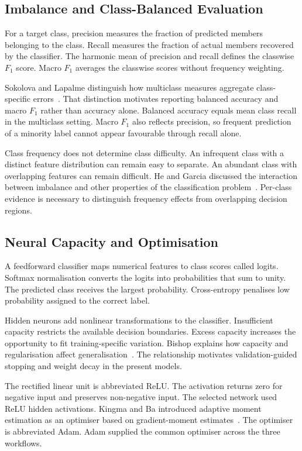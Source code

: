 \documentclass[conference,10pt]{IEEEtran}
\begin{document}
\subsection{Imbalance and Class-Balanced Evaluation}

For a target class, precision measures the fraction of predicted members belonging to the class. Recall measures the fraction of actual members recovered by the classifier. The harmonic mean of precision and recall defines the classwise $F_1$ score. Macro $F_1$ averages the classwise scores without frequency weighting.

Sokolova and Lapalme distinguish how multiclass measures aggregate class-specific errors~\cite{sokolova2009}. That distinction motivates reporting balanced accuracy and macro $F_1$ rather than accuracy alone. Balanced accuracy equals mean class recall in the multiclass setting. Macro $F_1$ also reflects precision, so frequent prediction of a minority label cannot appear favourable through recall alone.

Class frequency does not determine class difficulty. An infrequent class with a distinct feature distribution can remain easy to separate. An abundant class with overlapping features can remain difficult. He and Garcia discussed the interaction between imbalance and other properties of the classification problem~\cite{he2009}. Per-class evidence is necessary to distinguish frequency effects from overlapping decision regions.

\subsection{Neural Capacity and Optimisation}

A feedforward classifier maps numerical features to class scores called logits. Softmax normalisation converts the logits into probabilities that sum to unity. The predicted class receives the largest probability. Cross-entropy penalises low probability assigned to the correct label.

Hidden neurons add nonlinear transformations to the classifier. Insufficient capacity restricts the available decision boundaries. Excess capacity increases the opportunity to fit training-specific variation. Bishop explains how capacity and regularisation affect generalisation~\cite{bishop2006}. The relationship motivates validation-guided stopping and weight decay in the present models.

The rectified linear unit is abbreviated ReLU. The activation returns zero for negative input and preserves non-negative input. The selected network used ReLU hidden activations. Kingma and Ba introduced adaptive moment estimation as an optimiser based on gradient-moment estimates~\cite{kingma2015}. The optimiser is abbreviated Adam. Adam supplied the common optimiser across the three workflows.
\end{document}

